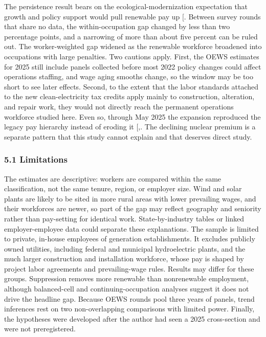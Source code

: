 \documentclass[
  11pt,
]{article}
\begin{document}
The persistence result bears on the ecological-modernization expectation
that growth and policy support would pull renewable pay up
{[}\citeproc{ref-spaargaren1992sociology}{10}{]}. Between survey rounds
that share no data, the within-occupation gap changed by less than two
percentage points, and a narrowing of more than about five percent can
be ruled out. The worker-weighted gap widened as the renewable workforce
broadened into occupations with large penalties. Two cautions apply.
First, the OEWS estimates for 2025 still include panels collected before
most 2022 policy changes could affect operations staffing, and wage
aging smooths change, so the window may be too short to see later
effects. Second, to the extent that the labor standards attached to the
new clean-electricity tax credits apply mainly to construction,
alteration, and repair work, they would not directly reach the permanent
operations workforce studied here. Even so, through May 2025 the
expansion reproduced the legacy pay hierarchy instead of eroding it
{[},\citeproc{ref-york2003key}{41}{]}.
The declining nuclear premium is a separate pattern that this study
cannot explain and that deserves direct study.

\subsubsection{5.1 Limitations}\label{limitations}

The estimates are descriptive: workers are compared within the same
classification, not the same tenure, region, or employer size. Wind and
solar plants are likely to be sited in more rural areas with lower
prevailing wages, and their workforces are newer, so part of the gap may
reflect geography and seniority rather than pay-setting for identical
work. State-by-industry tables or linked employer-employee data could
separate these explanations. The sample is limited to private, in-house
employees of generation establishments. It excludes publicly owned
utilities, including federal and municipal hydroelectric plants, and the
much larger construction and installation workforce, whose pay is shaped
by project labor agreements and prevailing-wage rules. Results may
differ for these groups. Suppression removes more renewable than
nonrenewable employment, although balanced-cell and
continuing-occupation analyses suggest it does not drive the headline
gap. Because OEWS rounds pool three years of panels, trend inferences
rest on two non-overlapping comparisons with limited power. Finally, the
hypotheses were developed after the author had seen a 2025 cross-section
and were not preregistered.
\end{document}
